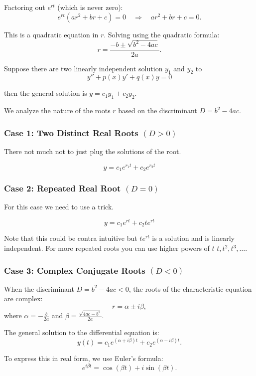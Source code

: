 Factoring out \( e^{rt} \) (which is never zero):
\[
e^{rt}(ar^2 + br + c) = 0 \quad \Rightarrow \quad ar^2 + br + c = 0.
\]

This is a quadratic equation in \( r \). Solving using the quadratic formula:
\[
r = \frac{-b \pm \sqrt{b^2 - 4ac}}{2a}.
\]

Suppose there are two linearly independent solution \(y_1\) and \(y_2\) to
\[
y'' + p(x)y' + q(x)y = 0
\]

then the general solution is \(y = c_1 y_1 + c_2 y_2\).
\vspace{\baselineskip}

We analyze the nature of the roots \( r \) based on the discriminant \( D = b^2 - 4ac \).

\subsubsection{Case 1: Two Distinct Real Roots \texorpdfstring{\( (D > 0) \)}{}}

There not much not to just plug the solutions of the root.

\[y = c_1 e^{r_1 t} + c_2 e^{r_2 t}\]

\subsubsection{Case 2: Repeated Real Root \texorpdfstring{\( (D = 0) \)}{}}

For this case we need to use a trick.

\[y = c_1 e^{rt} + c_2 te^{rt}\]

Note that this could be contra intuitive but \(te^{rt}\) is a solution and is linearly independent.
For more repeated roots you can use higher powers of \(t\) \(t, t^2, t^3, \dots\).

\subsubsection{Case 3: Complex Conjugate Roots \texorpdfstring{\( (D < 0) \)}{}}

When the discriminant \( D = b^2 - 4ac < 0 \), the roots of the characteristic equation are complex:
\[
r = \alpha \pm i\beta,
\]
where \( \alpha = -\frac{b}{2a} \) and \( \beta = \frac{\sqrt{4ac - b^2}}{2a} \).

The general solution to the differential equation is:
\[
y(t) = c_1 e^{(\alpha + i\beta)t} + c_2 e^{(\alpha - i\beta)t}.
\]

To express this in real form, we use Euler’s formula:
\[
e^{i\beta t} = \cos(\beta t) + i\sin(\beta t).
\]


